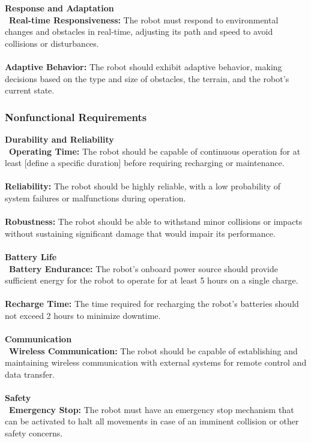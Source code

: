 \documentclass[12pt]{article}
\begin{document}
\textbf{Response and Adaptation}\\\
\noindent\textbf{Real-time Responsiveness:} The robot must respond to environmental changes and obstacles in real-time, adjusting its path and speed to avoid collisions or disturbances.\\\\
\noindent\textbf{Adaptive Behavior:} The robot should exhibit adaptive behavior, making decisions based on the type and size of obstacles, the terrain, and the robot's current state.\\
\subsubsection{Nonfunctional Requirements}
\textbf{Durability and Reliability}\\\
\noindent\textbf{Operating Time:} The robot should be capable of continuous operation for at least [define a specific duration] before requiring recharging or maintenance.\\\\
\noindent\textbf{Reliability:} The robot should be highly reliable, with a low probability of system failures or malfunctions during operation.\\\\
\noindent\textbf{Robustness:} The robot should be able to withstand minor collisions or impacts without sustaining significant damage that would impair its performance.\\\\
\textbf{Battery Life}\\\
\noindent\textbf{Battery Endurance:} The robot's onboard power source should provide sufficient energy for the robot to operate for at least 5 hours on a single charge.\\\\
\noindent\textbf{Recharge Time:} The time required for recharging the robot's batteries should not exceed 2 hours to minimize downtime.\\\\
\textbf{Communication}\\\
\noindent\textbf{Wireless Communication:} The robot should be capable of establishing and maintaining wireless communication with external systems for remote control and data transfer.\\\\
\textbf{Safety}\\\
\noindent\textbf{Emergency Stop:} The robot must have an emergency stop mechanism that can be activated to halt all movements in case of an imminent collision or other safety concerns.\\\\
\end{document}
